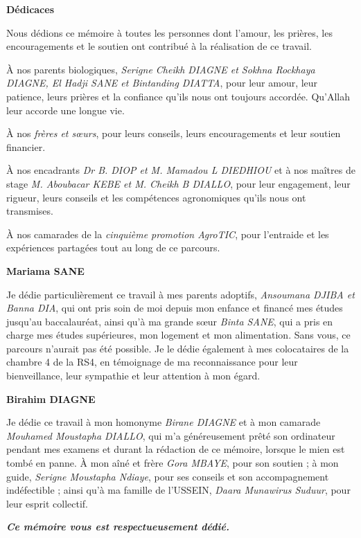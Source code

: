 \thispagestyle{empty}

\begin{center}
    {\fontsize{32}{38}\selectfont\bfseries Dédicaces\par}
\end{center}

\vspace{0.4cm}

{\fontsize{12}{15}\selectfont
{}
\setlength{\parindent}{0pt}
\setlength{\parskip}{0.25cm}

Nous dédions ce mémoire à toutes les personnes dont l'amour, les prières, les encouragements et le soutien ont contribué à la réalisation de ce travail.

À nos parents biologiques, \textit{Serigne Cheikh DIAGNE et Sokhna Rockhaya DIAGNE, El Hadji SANE et Bintanding DIATTA}, pour leur amour, leur patience, leurs prières et la confiance qu'ils nous ont toujours accordée. Qu'Allah leur accorde une longue vie.

À nos \textit{frères et sœurs}, pour leurs conseils, leurs encouragements et leur soutien financier.

À nos encadrants \textit{Dr B. DIOP et M. Mamadou L DIEDHIOU} et à nos maîtres de stage \textit{M. Aboubacar KEBE et M. Cheikh B DIALLO}, pour leur engagement, leur rigueur, leurs conseils et les compétences agronomiques qu'ils nous ont transmises.

À nos camarades de la \textit{cinquième promotion AgroTIC}, pour l'entraide et les expériences partagées tout au long de ce parcours.

\textbf{Mariama SANE}

Je dédie particulièrement ce travail à mes parents adoptifs, \textit{Ansoumana DJIBA et Banna DIA}, qui ont pris soin de moi depuis mon enfance et financé mes études jusqu'au baccalauréat, ainsi qu'à ma grande sœur \textit{Binta SANE}, qui a pris en charge mes études supérieures, mon logement et mon alimentation. Sans vous, ce parcours n'aurait pas été possible. 
Je le dédie également à mes colocataires de la chambre 4 de la RS4, en témoignage de ma reconnaissance pour leur bienveillance, leur sympathie et leur attention à mon égard.

\textbf{Birahim DIAGNE}

Je dédie ce travail à mon homonyme \textit{Birane DIAGNE} et à mon camarade \textit{Mouhamed Moustapha DIALLO}, qui m'a généreusement prêté son ordinateur pendant mes examens et durant la rédaction de ce mémoire, lorsque le mien est tombé en panne. À mon aîné et frère \textit{Gora MBAYE}, pour son soutien ; à mon guide, \textit{Serigne Moustapha Ndiaye}, pour ses conseils et son accompagnement indéfectible ; ainsi qu'à ma famille de l'USSEIN, \textit{Daara Munawirus Suduur}, pour leur esprit collectif.

\begin{center}
\itshape
\textbf{\textit{Ce mémoire vous est respectueusement dédié.}}
\end{center}

}